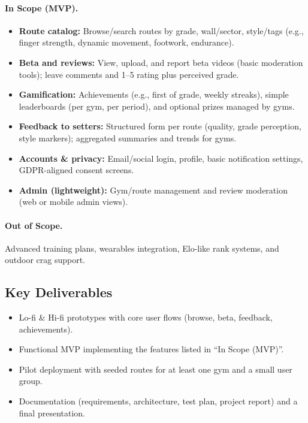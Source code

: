 \documentclass[12pt,a4paper]{report}
\renewcommand\_{\textunderscore\hspace{0pt}}
\begin{document}
\paragraph{In Scope (MVP).}
\begin{itemize}[noitemsep]
    \item \textbf{Route catalog:} Browse/search routes by grade, wall/sector, style/tags (e.g., finger strength, dynamic movement, footwork, endurance).
    \item \textbf{Beta and reviews:} View, upload, and report beta videos (basic moderation tools); leave comments and 1--5 rating plus perceived grade.
    \item \textbf{Gamification:} Achievements (e.g., first of grade, weekly streaks), simple leaderboards (per gym, per period), and optional prizes managed by gyms.
    \item \textbf{Feedback to setters:} Structured form per route (quality, grade perception, style markers); aggregated summaries and trends for gyms.
    \item \textbf{Accounts \& privacy:} Email/social login, profile, basic notification settings, GDPR-aligned consent screens.
    \item \textbf{Admin (lightweight):} Gym/route management and review moderation (web or mobile admin views).
\end{itemize}

\paragraph{Out of Scope.} Advanced training plans, wearables integration, Elo-like rank systems, and outdoor crag support.

\subsection{Key Deliverables}

\begin{itemize}[noitemsep]
    \item Lo-fi \& Hi-fi prototypes with core user flows (browse, beta, feedback, achievements).
    \item Functional MVP implementing the features listed in ``In Scope (MVP)''.
    \item Pilot deployment with seeded routes for at least one gym and a small user group.
    \item Documentation (requirements, architecture, test plan, project report) and a final presentation.
\end{itemize}
\end{document}
